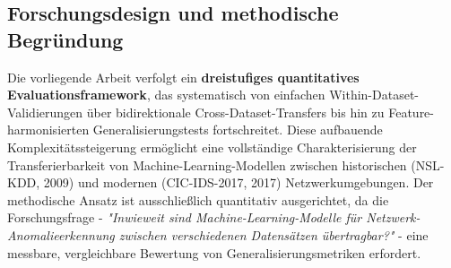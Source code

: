 \documentclass[11pt,a4paper]{article}
\begin{document}
    \subsection{Forschungsdesign und methodische Begründung}

    Die vorliegende Arbeit verfolgt ein \textbf{dreistufiges quantitatives Evaluationsframework}, das systematisch von einfachen Within-Dataset-Validierungen über bidirektionale Cross-Dataset-Transfers bis hin zu Feature-harmonisierten Generalisierungstests fortschreitet. Diese aufbauende Komplexitätssteigerung ermöglicht eine vollständige Charakterisierung der Transferierbarkeit von Machine-Learning-Modellen zwischen historischen (NSL-KDD, 2009) und modernen (CIC-IDS-2017, 2017) Netzwerkumgebungen. Der methodische Ansatz ist ausschließlich quantitativ ausgerichtet, da die Forschungsfrage - \textit{"Inwieweit sind Machine-Learning-Modelle für Netzwerk-Anomalieerkennung zwischen verschiedenen Datensätzen übertragbar?"} - eine messbare, vergleichbare Bewertung von Generalisierungsmetriken erfordert.
\end{document}
